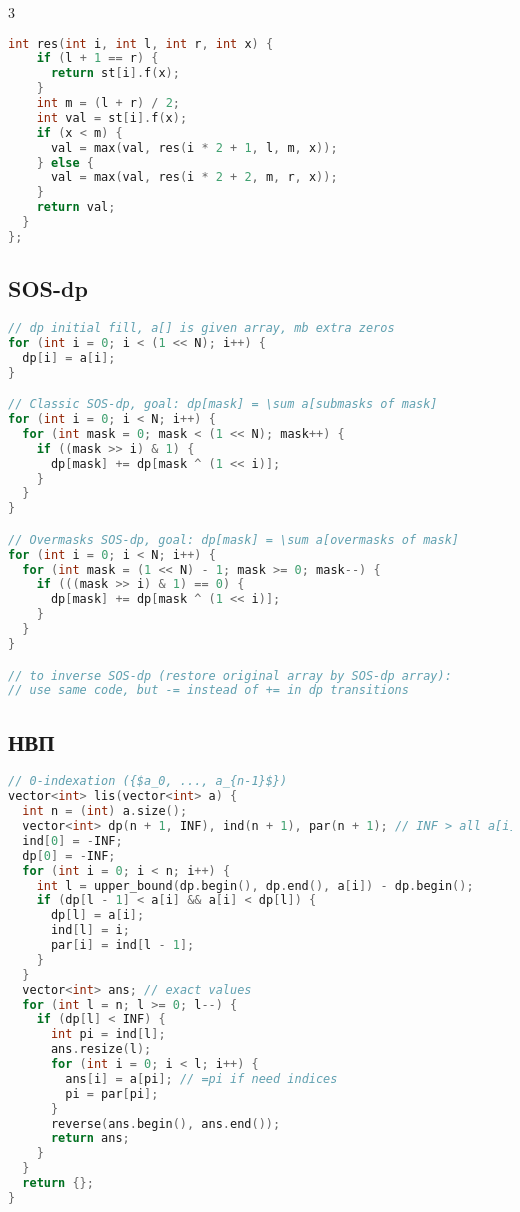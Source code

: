 \documentclass[9pt,a4paper,landscape,twosided]{extarticle}
\begin{document}
\begin{multicols*}{3}
\begin{lstlisting}[language=C++]
  int res(int i, int l, int r, int x) {
    if (l + 1 == r) {
      return st[i].f(x);
    }
    int m = (l + r) / 2;
    int val = st[i].f(x);
    if (x < m) {
      val = max(val, res(i * 2 + 1, l, m, x));
    } else {
      val = max(val, res(i * 2 + 2, m, r, x));
    }
    return val;
  }
};
\end{lstlisting}

\subsection{SOS-dp}
\begin{lstlisting}[language=C++]
// dp initial fill, a[] is given array, mb extra zeros
for (int i = 0; i < (1 << N); i++) {
  dp[i] = a[i];
}

// Classic SOS-dp, goal: dp[mask] = \sum a[submasks of mask]
for (int i = 0; i < N; i++) {
  for (int mask = 0; mask < (1 << N); mask++) {
    if ((mask >> i) & 1) {
      dp[mask] += dp[mask ^ (1 << i)];
    }
  }
}

// Overmasks SOS-dp, goal: dp[mask] = \sum a[overmasks of mask]
for (int i = 0; i < N; i++) {
  for (int mask = (1 << N) - 1; mask >= 0; mask--) {
    if (((mask >> i) & 1) == 0) {
      dp[mask] += dp[mask ^ (1 << i)];
    }
  }
}

// to inverse SOS-dp (restore original array by SOS-dp array):
// use same code, but -= instead of += in dp transitions
\end{lstlisting}

\subsection{НВП}
\begin{lstlisting}[language=C++]
// 0-indexation ({$a_0, ..., a_{n-1}$})
vector<int> lis(vector<int> a) {
  int n = (int) a.size();
  vector<int> dp(n + 1, INF), ind(n + 1), par(n + 1); // INF > all a[i] required
  ind[0] = -INF;
  dp[0] = -INF;
  for (int i = 0; i < n; i++) {
    int l = upper_bound(dp.begin(), dp.end(), a[i]) - dp.begin();
    if (dp[l - 1] < a[i] && a[i] < dp[l]) {
      dp[l] = a[i];
      ind[l] = i;
      par[i] = ind[l - 1];
    }
  }
  vector<int> ans; // exact values
  for (int l = n; l >= 0; l--) {
    if (dp[l] < INF) {
      int pi = ind[l];
      ans.resize(l);
      for (int i = 0; i < l; i++) {
        ans[i] = a[pi]; // =pi if need indices
        pi = par[pi];
      }
      reverse(ans.begin(), ans.end());
      return ans;
    }
  }
  return {};
}
\end{lstlisting}


\end{multicols*}
\end{document}

